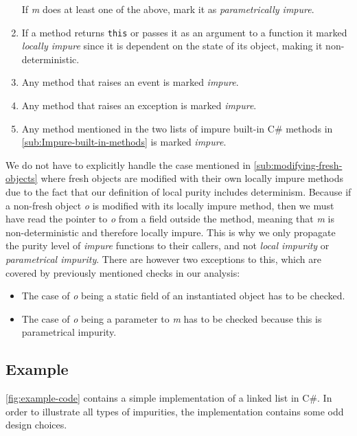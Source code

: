 \documentclass[a4paper,12pt]{article}
\begin{document}
\begin{enumerate}
\begin{itemize}
    \end{itemize}
    If \textit{m} does at least one of the above, mark it as \textit{parametrically impure}.
  \item If a method returns \texttt{this} or passes it as an argument to a function it marked \textit{locally impure} since it is dependent on the state of its object, making it non-deterministic.
  \item Any method that raises an event is marked \textit{impure}. \label{itm:raises-event}
  \item Any method that raises an exception is marked \textit{impure}. \label{itm:raises-exception}
  \item Any method mentioned in the two lists of impure built-in C\# methods in \autoref{sub:Impure-built-in-methods} is marked \textit{impure}. \label{itm:impure-built-in}
\end{enumerate}

We do not have to explicitly handle the case mentioned in \autoref{sub:modifying-fresh-objects} where fresh objects are modified with their own locally impure methods due to the fact that our definition of local purity includes determinism. Because if a non-fresh object \textit{o} is modified with its locally impure method, then we must have read the pointer to \textit{o} from a field outside the method, meaning that \textit{m} is non-deterministic and therefore locally impure. This is why we only propagate the purity level of \textit{impure} functions to their callers, and not \textit{local impurity} or \textit{parametrical impurity}. There are however two exceptions to this, which are covered by previously mentioned checks in our analysis:
\begin{itemize}
  \item The case of \textit{o} being a static field of an instantiated object has to be checked.
  \item The case of \textit{o} being a parameter to \textit{m} has to be checked because this is parametrical impurity.
\end{itemize}

\subsection{Example} \label{ssub:Example}
\autoref{fig:example-code} contains a simple implementation of a linked list in C\#. In order to illustrate all types of impurities, the implementation contains some odd design choices.
\end{document}
